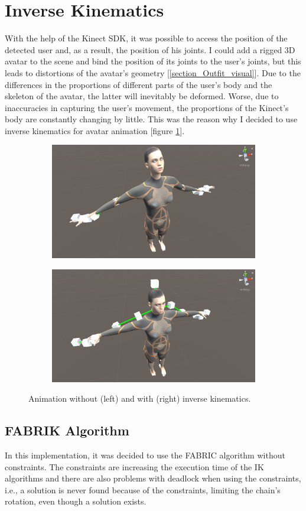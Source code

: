 \documentclass[a4paper]{report}
\begin{document}
\section{Inverse Kinematics}
\label{section_avatar}
 \qquad With the help of the Kinect SDK, it was possible to access the position of the detected user and, as a result, the position of his joints. I could add a rigged 3D avatar to the scene and bind the position of its joints to the user's joints, but this leads to distortions of the avatar's geometry [\ref{section_Outfit_visual}]. Due to the differences in the proportions of different parts of the user's body and the skeleton of the avatar, the latter will inevitably be deformed. Worse, due to inaccuracies in capturing the user's movement, the proportions of the Kinect's body are constantly changing by little. This was the reason why I decided to use inverse kinematics for avatar animation [figure \ref{fig:IK_usage}].
 
 
 \begin{figure}[H]
\centering
\begin{subfigure}{\textwidth}
  \centering
  \includegraphics[width=.45\textwidth , keepaspectratio]{images/IK/Screenshot 2021-05-17 093134.png}
\end{subfigure}%
\begin{subfigure}{\textwidth}
  \centering
 \includegraphics[width=.45\textwidth , keepaspectratio]{images/IK/Screenshot 2021-05-17 093228.png}
\end{subfigure}
\caption{Animation without (left) and with (right) inverse kinematics.}
\label{fig:IK_usage}
\end{figure}
	
 
 
 \subsection{FABRIK Algorithm}
 \qquad In this implementation, it was decided to use the FABRIC algorithm without constraints. The constraints are increasing the execution time of the IK algorithms and there are also problems with deadlock when using the constraints, i.e., a solution is never found because of the constraints\cite{ikmocap}, limiting the chain’s rotation, even though a solution exists. 
\end{document}
